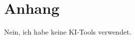 \chapter{Anhang}\label{app:supplemental-information}
\thispagestyle{empty}

Nein, ich habe keine KI-Tools verwendet.
